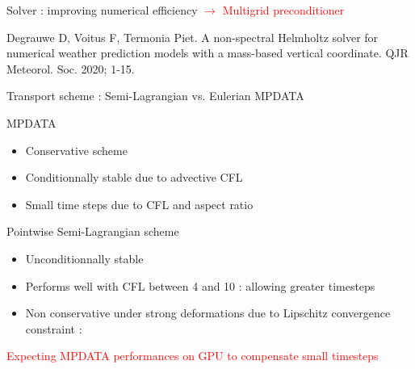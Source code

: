 \documentclass[10pt]{beamer}
\begin{document}
\begin{frame}{Solver : improving numerical efficiency}
    \textcolor{red}{$\rightarrow$ Multigrid preconditioner}

    \vspace{0.5cm}
    \tiny Degrauwe D, Voitus F, Termonia Piet. A non-spectral Helmholtz solver for numerical weather prediction models with a mass-based vertical coordinate. QJR Meteorol. Soc. 2020; 1-15. 

\end{frame}


\begin{frame}{Transport scheme : Semi-Lagrangian vs. Eulerian MPDATA}
    
    \begin{block}{MPDATA}
        \begin{itemize}
            \item[\textcolor{blue}{\faIcon{plus}}] \small Conservative scheme
            \item[\textcolor{red}{\faIcon{minus}}] Conditionnally stable due to advective CFL %
            \item[\textcolor{red}{\faIcon{minus}}] Small time steps due to CFL and aspect ratio %
        \end{itemize}
    \end{block}

    \begin{block}{Pointwise Semi-Lagrangian scheme}
        \begin{itemize} 
            \item[\textcolor{blue}{\faIcon{plus}}] \small Unconditionnally stable
            \item[\textcolor{blue}{\faIcon{plus}}] Performs well with CFL between 4 and 10 : allowing greater timesteps
            \item[\textcolor{red}{\faIcon{minus}}] Non conservative under strong deformations due to Lipschitz convergence constraint : %
        \end{itemize}
    \end{block}

    \textcolor{red}{\rightarrow Expecting MPDATA performances on GPU to compensate small timesteps}
  
    
\end{frame}

\end{document}
